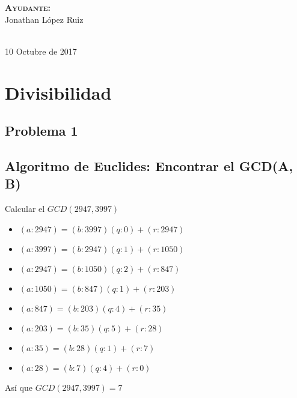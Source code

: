\documentclass[12pt, fleqn]{article}                             %
\begin{document}
\begin{titlepage}
\begin{minipage}{0.4\textwidth}
\begin{flushright}
            \vspace{2em}

            \textbf{\textsc{Ayudante: }}\\
            Jonathan López Ruiz
        \end{flushright}
    \end{minipage}\\[3,5cm]

    
    {\large 10 Octubre de 2017}\\[1cm] 

    \vfill

\end{titlepage}


\tableofcontents{}
\label{sec:Index}

\clearpage




\section{Divisibilidad}

    \subsection{Problema 1}
    \subsection*{Algoritmo de Euclides: Encontrar el GCD(A, B)}

            Calcular el $GCD(2947, 3997)$
            \begin{itemize}
                \item $(a:2947) = (b:3997)(q:0) + (r:2947)$
                \item $(a:3997) = (b:2947)(q:1) + (r:1050)$
                \item $(a:2947) = (b:1050)(q:2) + (r:847)$
                \item $(a:1050) = (b:847)(q:1) + (r:203)$
                \item $(a:847) = (b:203)(q:4) + (r:35)$
                \item $(a:203) = (b:35)(q:5) + (r:28)$
                \item $(a:35) = (b:28)(q:1) + (r:7)$
                \item $(a:28) = (b:7)(q:4) + (r:0)$
            \end{itemize}                    
            Así que $GCD(2947, 3997) = 7$\\
\end{document}
